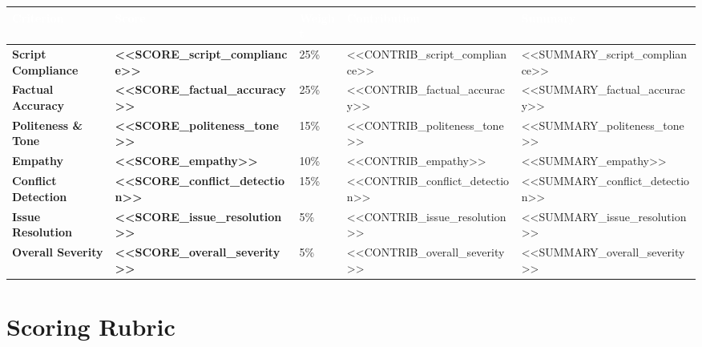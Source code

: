 \documentclass[12pt,a4paper]{article}
\begin{document}
\noindent
\begin{tabularx}{\textwidth}{L{3.8cm} C{1.4cm} C{1.4cm} C{2cm} X}
\toprule
{}
\textcolor{white}{\textbf{Criterion}} &
\textcolor{white}{\textbf{Score}} &
\textcolor{white}{\textbf{Weight}} &
\textcolor{white}{\textbf{Contribution}} &
\textcolor{white}{\textbf{Summary}} \\
\midrule
{}
\textbf{Script Compliance}
  & \textcolor{<<COLOR_script_compliance>>}{\textbf{<<SCORE_script_compliance>>}}
  & 25\%
  & <<CONTRIB_script_compliance>>
  & \small <<SUMMARY_script_compliance>> \\[0.3em]
\textbf{Factual Accuracy}
  & \textcolor{<<COLOR_factual_accuracy>>}{\textbf{<<SCORE_factual_accuracy>>}}
  & 25\%
  & <<CONTRIB_factual_accuracy>>
  & \small <<SUMMARY_factual_accuracy>> \\[0.3em]
\textbf{Politeness \& Tone}
  & \textcolor{<<COLOR_politeness_tone>>}{\textbf{<<SCORE_politeness_tone>>}}
  & 15\%
  & <<CONTRIB_politeness_tone>>
  & \small <<SUMMARY_politeness_tone>> \\[0.3em]
\textbf{Empathy}
  & \textcolor{<<COLOR_empathy>>}{\textbf{<<SCORE_empathy>>}}
  & 10\%
  & <<CONTRIB_empathy>>
  & \small <<SUMMARY_empathy>> \\[0.3em]
\textbf{Conflict Detection}
  & \textcolor{<<COLOR_conflict_detection>>}{\textbf{<<SCORE_conflict_detection>>}}
  & 15\%
  & <<CONTRIB_conflict_detection>>
  & \small <<SUMMARY_conflict_detection>> \\[0.3em]
\textbf{Issue Resolution}
  & \textcolor{<<COLOR_issue_resolution>>}{\textbf{<<SCORE_issue_resolution>>}}
  & 5\%
  & <<CONTRIB_issue_resolution>>
  & \small <<SUMMARY_issue_resolution>> \\[0.3em]
\textbf{Overall Severity}
  & \textcolor{<<COLOR_overall_severity>>}{\textbf{<<SCORE_overall_severity>>}}
  & 5\%
  & <<CONTRIB_overall_severity>>
  & \small <<SUMMARY_overall_severity>> \\
\bottomrule
\end{tabularx}

\vspace{1.8em}

\section*{\textcolor{accent}{Scoring Rubric}}
\end{document}
